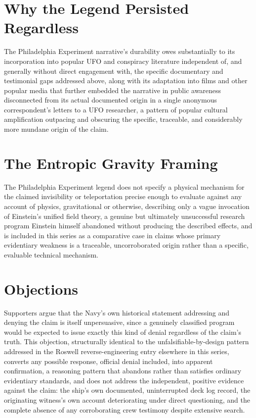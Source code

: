 \documentclass[11pt]{article}
\begin{document}
\section{Why the Legend Persisted Regardless}

The Philadelphia Experiment narrative's durability owes substantially to its incorporation into popular UFO and conspiracy literature independent of, and generally without direct engagement with, the specific documentary and testimonial gaps addressed above, along with its adaptation into films and other popular media that further embedded the narrative in public awareness disconnected from its actual documented origin in a single anonymous correspondent's letters to a UFO researcher, a pattern of popular cultural amplification outpacing and obscuring the specific, traceable, and considerably more mundane origin of the claim.

\section{The Entropic Gravity Framing}

The Philadelphia Experiment legend does not specify a physical mechanism for the claimed invisibility or teleportation precise enough to evaluate against any account of physics, gravitational or otherwise, describing only a vague invocation of Einstein's unified field theory, a genuine but ultimately unsuccessful research program Einstein himself abandoned without producing the described effects, and is included in this series as a comparative case in claims whose primary evidentiary weakness is a traceable, uncorroborated origin rather than a specific, evaluable technical mechanism.

\section{Objections}

Supporters argue that the Navy's own historical statement addressing and denying the claim is itself unpersuasive, since a genuinely classified program would be expected to issue exactly this kind of denial regardless of the claim's truth. This objection, structurally identical to the unfalsifiable-by-design pattern addressed in the Roswell reverse-engineering entry elsewhere in this series, converts any possible response, official denial included, into apparent confirmation, a reasoning pattern that abandons rather than satisfies ordinary evidentiary standards, and does not address the independent, positive evidence against the claim: the ship's own documented, uninterrupted deck log record, the originating witness's own account deteriorating under direct questioning, and the complete absence of any corroborating crew testimony despite extensive search.
\end{document}
